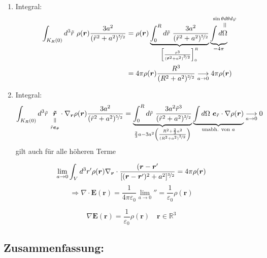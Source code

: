 \documentclass[titlepage,11pt,a4paper,ngerman]{report}
\newcommand{\verteq}{\rotatebox{90}{$\,=$}}
\newcommand{\equalto}[2]{\underset{\scriptstyle\overset{\mkern4mu\verteq}{#2}}{#1}}
\newcommand{\equaltoup}[2]{\overset{\scriptstyle\underset{\mkern4mu\verteq}{#2}}{#1}}
\newcommand{\kq}{\frac{1}{4\pi\epsilon_0}}
\newcommand{\intt}[2]{\int_{#1}^{#2}}
\renewcommand{\vec}[1]{\boldsymbol{#1}}
\renewcommand{\epsilon}{\varepsilon}
\newcommand{\rbox}[1]{\begin{tcolorbox}[colback=white,colframe=red!75!black]#1\end{tcolorbox}}
\begin{document}
\begin{enumerate}
	\item Integral:
	\begin{align*}
	\int_{K_R (0)} d^3 \tilde r\ \rho(\vec{r}) \frac{3a^2}{(\tilde{r}^2 + a^2)^{\nicefrac{5}{2}}} &= \rho(\vec{r}) \underbrace{\intt{0}{R} d\tilde r\ \frac{3a^2}{(\tilde{r}^2 + a^2)^{\nicefrac{5}{2}}}}_{\left[\frac{\tilde r^3}{(\vec{\tilde{r}}^2 + a^2)^{\nicefrac{3}{2}}}\right]_0^R} \underbrace{\int d \equaltoup{\Omega}{\mathclap{\sin \theta d \theta d \varphi}}}_{= 4\pi}\\
	&= 4 \pi \rho(\vec{r}) \frac{R^3}{(R^2 + a^2)^{\nicefrac{3}{2}}} \underset{a \to 0}{\longrightarrow} 4 \pi \rho(\vec{r})
	\end{align*} 
	\item Integral:
	$$\int_{K_R (0)} d^3 \tilde{r}\ \equalto{\vec{\tilde{r}}}{\tilde{r}\vec{e}_{\vec{\tilde{r}}}} \cdot \nabla_{\vec{r}} \rho(\vec{r}) \frac{3 a^2}{(\tilde{r}^2 + a^2)^{\nicefrac{5}{2}}} = \underbrace{\intt{0}{R} d \tilde r\ \frac{3a^2 \tilde r^3}{(\tilde r^2 + a^2)^{\nicefrac{3}{2}}}}_{\frac{2}{3}a -3a^2 \left(\frac{R^2 +\frac{2}{3}a^2}{(R^2 + a^2)^{\nicefrac{3}{2}}}\right)} \underbrace{\int d \Omega\ \vec{e}_{\tilde{r}} \cdot \nabla \rho(\vec{r})}_{\textrm{unabh. von } a} \underset{a \to 0}{\longrightarrow} 0$$
	gilt auch für alle höheren Terme
\end{enumerate}

$$\lim_{a \to 0} \int_V d^3 r' \rho(\vec{r}) \nabla_{\vec{r}}\cdot \frac{(\vec{r}-\vec{r}'}{[(\vec{r}-\vec{r}')^2 + a^2]^{\nicefrac{3}{2}}} = 4 \pi \rho (\vec{r})$$
$$\Rightarrow \nabla \cdot \vec{E}(\vec{r}) = \kq \lim_{a \to 0} '' = \frac{1}{\epsilon_0} \rho(\vec{r})$$

\rbox{$$\nabla \vec{E}(\vec{r}) = \frac{1}{\epsilon_0} \rho(\vec{r}) \quad \vec{r} \in \mathbb R^3$$}

\subsection{Zusammenfassung:}
\end{document}
